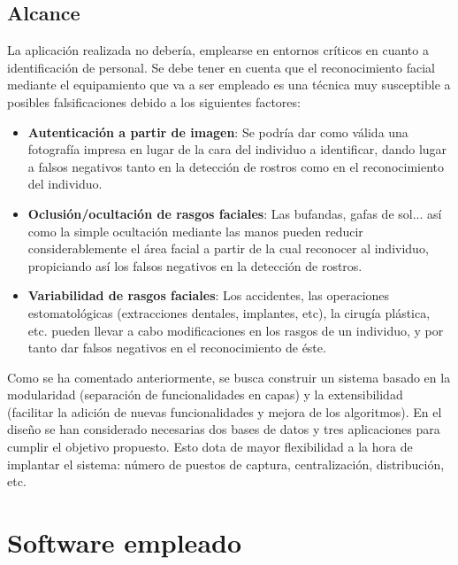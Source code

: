 
\subsection{Alcance}
La aplicación realizada no debería, emplearse en entornos críticos en cuanto a identificación de personal. Se debe tener en cuenta que el reconocimiento facial mediante el equipamiento que va a ser empleado es una técnica muy susceptible a posibles falsificaciones debido a los siguientes factores:
\begin{itemize}
	\item{\textbf{Autenticación a partir de imagen}:} Se podría dar como válida una fotografía impresa en lugar de la cara del individuo a identificar, dando lugar a falsos negativos tanto en la detección de rostros como en el reconocimiento del individuo.
	\item{\textbf{Oclusión/ocultación de rasgos faciales}:} Las bufandas, gafas de sol... así como la simple ocultación mediante las manos pueden reducir considerablemente el área facial a partir de la cual reconocer al individuo, propiciando así los falsos negativos en la detección de rostros.
	\item{\textbf{Variabilidad de rasgos faciales}:} Los accidentes, las operaciones estomatológicas (extracciones dentales, implantes, etc), la cirugía plástica, etc. pueden llevar a cabo modificaciones en los rasgos de un individuo, y por tanto dar falsos negativos en el reconocimiento de éste.
\end{itemize}

Como se ha comentado anteriormente, se busca construir un sistema basado en la modularidad (separación de funcionalidades en capas) y la extensibilidad (facilitar la adición de nuevas funcionalidades y mejora de los algoritmos). En el diseño se han considerado necesarias dos bases de datos y tres aplicaciones para cumplir el objetivo propuesto. Esto dota de mayor flexibilidad a la hora de implantar el sistema: número de puestos de captura, centralización, distribución, etc.


\section{Software empleado}

